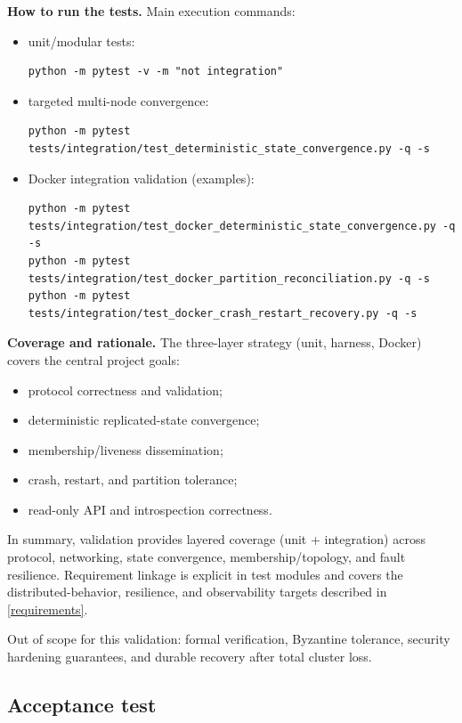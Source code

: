 \textbf{How to run the tests.}
Main execution commands:
\begin{itemize}
  \item unit/modular tests:
\begin{verbatim}
python -m pytest -v -m "not integration"
\end{verbatim}
  \item targeted multi-node convergence:
\begin{verbatim}
python -m pytest tests/integration/test_deterministic_state_convergence.py -q -s
\end{verbatim}
  \item Docker integration validation (examples):
\begin{verbatim}
python -m pytest tests/integration/test_docker_deterministic_state_convergence.py -q -s
python -m pytest tests/integration/test_docker_partition_reconciliation.py -q -s
python -m pytest tests/integration/test_docker_crash_restart_recovery.py -q -s
\end{verbatim}
\end{itemize}

\textbf{Coverage and rationale.}
The three-layer strategy (unit, harness, Docker) covers the central project goals:
\begin{itemize}
  \item protocol correctness and validation;
  \item deterministic replicated-state convergence;
  \item membership/liveness dissemination;
  \item crash, restart, and partition tolerance;
  \item read-only API and introspection correctness.
\end{itemize}

In summary, validation provides layered coverage (unit + integration) across protocol, networking, state convergence, membership/topology, and fault resilience.
Requirement linkage is explicit in test modules and covers the distributed-behavior, resilience, and observability targets described in \cref{requirements}.

Out of scope for this validation: formal verification, Byzantine tolerance, security hardening guarantees, and durable recovery after total cluster loss.

\subsection{Acceptance test}\label{acceptance-test}


